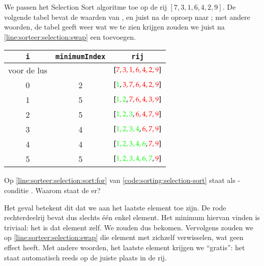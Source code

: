 \begin{example}
\newcommand{\NHL}[1]{{\color{red} #1}}
\newcommand{\HL}[1]{{\color{green} #1}}
\newcommand{\MIN}[1]{\framebox{#1}}
We passen het Selection Sort algoritme toe op de rij $[7,3,1,6,4,2,9]$.
De volgende tabel bevat de waarden van ,  en
 juist na de oproep naar ;
met andere woorden, de tabel geeft weer wat we te zien krijgen
zouden we juist na \cref{line:sorteer:selection:swap} een  toevoegen.
\begin{center}
  \begin{tabular}{c|c|c}
    {\tt \bfseries i} & {\tt \bfseries minimumIndex} & {\tt \bfseries rij} \\
    \hline
    voor de lus & & $[\NHL{7,3,1,6,4,2,9}]$ \\
    0 & 2 & $[\HL1,\NHL{3,7,6,4,2,9}]$ \\
    1 & 5 & $[\HL{1,2},\NHL{7,6,4,3,9}]$ \\
    2 & 5 & $[\HL{1,2,3},\NHL{6,4,7,9}]$ \\
    3 & 4 & $[\HL{1,2,3,4},\NHL{6,7,9}]$ \\
    4 & 4 & $[\HL{1,2,3,4,6},\NHL{7,9}]$ \\
    5 & 5 & $[\HL{1,2,3,4,6,7},\NHL{9}]$ \\
  \end{tabular}
\end{center}
\end{example}

\begin{exercise}
Op \cref{line:sorteer:selection:sort:for} van \cref{code:sorting:selection-sort} staat
als -conditie . Waarom staat de  er?
\begin{solution}
Het geval  betekent dit dat we aan het laatste
element toe zijn. De rode rechterdeelrij bevat dus slechts \'e\'en enkel element.
Het minimum hiervan vinden is triviaal: het is dat element zelf.
We zouden dus  bekomen. Vervolgens zouden we
op \cref{line:sorteer:selection:swap} die element met zichzelf verwisselen,
wat geen effect heeft. Met andere woorden, het laatste element krijgen we ``gratis'':
het staat automatisch reeds op de juiste plaats in de rij.
\end{solution}
\end{exercise}

